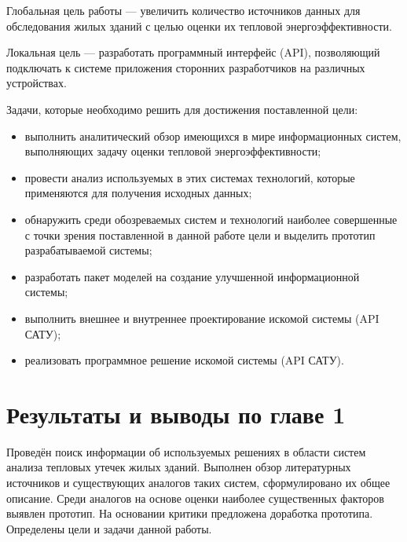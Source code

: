 \par

	Глобальная цель работы --- увеличить количество источников данных для обследования жилых зданий с целью оценки их тепловой энергоэффективности.

	Локальная цель --- разработать программный интерфейс ({API}), позволяющий подключать к системе приложения сторонних разработчиков на различных устройствах.

	Задачи, которые необходимо решить для достижения поставленной цели:

	\begin{itemize}
		\item выполнить аналитический обзор имеющихся в мире информационных систем, выполняющих задачу оценки тепловой энергоэффективности;
		\item провести анализ используемых в этих системах технологий, которые применяются для получения исходных данных;
		\item обнаружить среди обозреваемых систем и технологий наиболее совершенные с точки зрения поставленной в данной работе цели и выделить прототип разрабатываемой системы;
		\item разработать пакет моделей на создание улучшенной информационной системы;
		\item выполнить внешнее и внутреннее проектирование искомой системы (API САТУ);
		\item реализовать программное решение искомой системы (API САТУ).
	\end{itemize}



\section{Результаты и выводы по главе 1}

\par

	Проведён поиск информации об используемых решениях в области систем анализа тепловых утечек жилых зданий. Выполнен обзор литературных источников и существующих аналогов таких систем, сформулировано их общее описание. Среди аналогов на основе оценки наиболее существенных факторов выявлен прототип. На основании критики предложена доработка прототипа. Определены цели и задачи данной работы.
